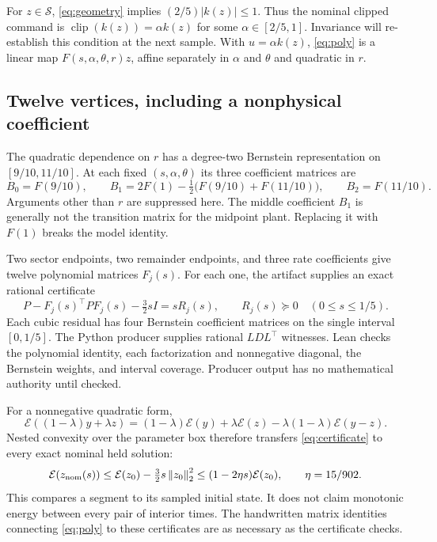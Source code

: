 \documentclass[10pt]{article}
\newcommand{\E}{\mathcal E}
\newcommand{\clip}{\operatorname{clip}}
\newcommand{\norm}[1]{\left\lVert#1\right\rVert}
\begin{document}
For $z\in\mathcal S$, \eqref{eq:geometry} implies $(2/5)|k(z)|\le1$. Thus the nominal clipped command is $\clip(k(z))=\alpha k(z)$ for some $\alpha\in[2/5,1]$. Invariance will re-establish this condition at the next sample. With $u=\alpha k(z)$, \eqref{eq:poly} is a linear map $F(s,\alpha,\theta,r)z$, affine separately in $\alpha$ and $\theta$ and quadratic in $r$.

\subsection{Twelve vertices, including a nonphysical coefficient}
The quadratic dependence on $r$ has a degree-two Bernstein representation on $[9/10,11/10]$. At each fixed $(s,\alpha,\theta)$ its three coefficient matrices are
\[
 B_0=F(9/10),\qquad
 B_1=2F(1)-\tfrac12\bigl(F(9/10)+F(11/10)\bigr),\qquad
 B_2=F(11/10).
\]
Arguments other than $r$ are suppressed here. The middle coefficient $B_1$ is generally not the transition matrix for the midpoint plant. Replacing it with $F(1)$ breaks the model identity.

Two sector endpoints, two remainder endpoints, and three rate coefficients give twelve polynomial matrices $F_j(s)$. For each one, the artifact supplies an exact rational certificate
\begin{equation}\label{eq:certificate}
 P-F_j(s)^\top P F_j(s)-\tfrac32sI=sR_j(s),\qquad
 R_j(s)\succeq0\quad(0\le s\le1/5).
\end{equation}
Each cubic residual has four Bernstein coefficient matrices on the single interval $[0,1/5]$. The Python producer supplies rational $LDL^\top$ witnesses. Lean checks the polynomial identity, each factorization and nonnegative diagonal, the Bernstein weights, and interval coverage. Producer output has no mathematical authority until checked.

For a nonnegative quadratic form,
\[
 \E((1-\lambda)y+\lambda z)
 =(1-\lambda)\E(y)+\lambda\E(z)-\lambda(1-\lambda)\E(y-z).
\]
Nested convexity over the parameter box therefore transfers \eqref{eq:certificate} to every exact nominal held solution:
\begin{equation}\label{eq:decrease}
 \E(z_{\rm nom}(s))\le\E(z_0)-\tfrac32s\norm{z_0}_2^2
 \le(1-2\eta s)\E(z_0),\qquad \eta=15/902.
\end{equation}
This compares a segment to its sampled initial state. It does not claim monotonic energy between every pair of interior times. The handwritten matrix identities connecting \eqref{eq:poly} to these certificates are as necessary as the certificate checks.
\end{document}

